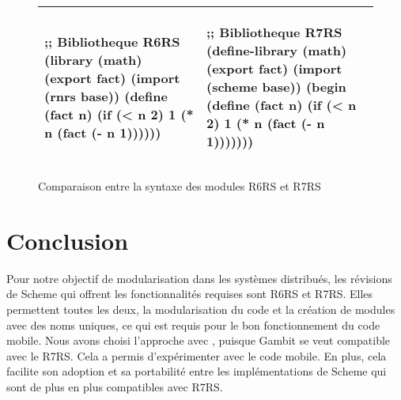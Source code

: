 
\begin{center}
  \begin{figure}[h]
  \begin{tabular}{|l|l|}
    \hline
    \begin{mplisting}{0.5}
;; Bibliotheque R6RS
(library (math)
  (export fact)
  (import (rnrs base))
  (define (fact n)
    (if (< n 2)
      1
      (* n (fact (- n 1))))))
\end{mplisting} &
    \begin{mplisting}{0.5}
;; Bibliotheque R7RS
(define-library (math)
  (export fact)
  (import (scheme base))
  (begin
    (define (fact n)
      (if (< n 2)
        1
        (* n (fact (- n 1)))))))
\end{mplisting}\\\hline
  \end{tabular}
    \caption{Comparaison entre la syntaxe des modules R6RS et R7RS}
  \label{fig:r6rs_r7rs_math_mdoule}
\end{figure}
\end{center}


\section{Conclusion}
%
Pour notre objectif de modularisation dans les systèmes distribués, les
révisions de Scheme qui offrent les fonctionnalités requises sont R6RS et R7RS.
Elles permettent toutes les deux, la modularisation du code et la création de
modules avec des noms uniques, ce qui est requis pour le bon fonctionnement du
code mobile.   Nous avons choisi l'approche avec ,
puisque Gambit se veut compatible avec le R7RS. Cela a permis d'expérimenter
avec le code mobile. En plus, cela facilite son adoption et sa portabilité
entre les implémentations de Scheme qui sont de plus en plus compatibles avec
R7RS.


